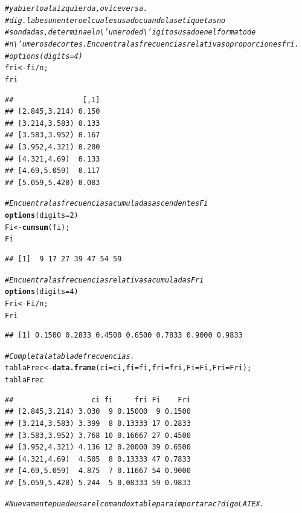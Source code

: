 \documentclass[12pt,letterpaper]{article}\usepackage[]{graphicx}\usepackage[]{color}
\makeatletter
\newcommand{\hlnum}[1]{\textcolor[rgb]{0.686,0.059,0.569}{#1}}%
\newcommand{\hlcom}[1]{\textcolor[rgb]{0.678,0.584,0.686}{\textit{#1}}}%
\newcommand{\hlopt}[1]{\textcolor[rgb]{0,0,0}{#1}}%
\newcommand{\hlstd}[1]{\textcolor[rgb]{0.345,0.345,0.345}{#1}}%
\newcommand{\hlkwb}[1]{\textcolor[rgb]{0.69,0.353,0.396}{#1}}%
\newcommand{\hlkwc}[1]{\textcolor[rgb]{0.333,0.667,0.333}{#1}}%
\newcommand{\hlkwd}[1]{\textcolor[rgb]{0.737,0.353,0.396}{\textbf{#1}}}%
\newenvironment{kframe}{%
 \def\at@end@of@kframe{}%
 \ifinner\ifhmode%
  \def\at@end@of@kframe{\end{minipage}}%
  \begin{minipage}{\columnwidth}%
 \fi\fi%
 \def\FrameCommand##1{\hskip\@totalleftmargin \hskip-\fboxsep
 \colorbox{shadecolor}{##1}\hskip-\fboxsep
     \hskip-\linewidth \hskip-\@totalleftmargin \hskip\columnwidth}%
 \MakeFramed {\advance\hsize-\width
   \@totalleftmargin\z@ \linewidth\hsize
   \@setminipage}}%
 {\par\unskip\endMakeFramed%
 \at@end@of@kframe}
\newenvironment{knitrout}{}{} %
\makeatother
\begin{document}
\begin{knitrout}
\begin{kframe}
\begin{alltt}
\hlcom{# y abierto a la izquierda, o viceversa.}
\hlcom{# dig.lab es un entero el cual es usado cuando las etiquetas no }
\hlcom{# son dadas, determina el n\textbackslash{}'umero de d\textbackslash{}'igitos usado en el formato de }
\hlcom{# n\textbackslash{}'umeros de cortes.Encuentra las frecuencias relativas o proporciones fri.}
\hlcom{# options(digits=4)}
\hlstd{fri} \hlkwb{<-} \hlstd{fi}\hlopt{/}\hlstd{n;}
\hlstd{fri}
\end{alltt}
\begin{verbatim}
##                [,1]
## [2.845,3.214) 0.150
## [3.214,3.583) 0.133
## [3.583,3.952) 0.167
## [3.952,4.321) 0.200
## [4.321,4.69)  0.133
## [4.69,5.059)  0.117
## [5.059,5.428) 0.083
\end{verbatim}
\begin{alltt}
\hlcom{# Encuentra las frecuencias acumuladas ascendentes Fi}
\hlkwd{options}\hlstd{(}\hlkwc{digits}\hlstd{=}\hlnum{2}\hlstd{)}
\hlstd{Fi} \hlkwb{<-} \hlkwd{cumsum}\hlstd{(fi);}
\hlstd{Fi}
\end{alltt}
\begin{verbatim}
## [1]  9 17 27 39 47 54 59
\end{verbatim}
\begin{alltt}
\hlcom{# Encuentra las frecuencias relativas acumuladas Fri}
\hlkwd{options}\hlstd{(}\hlkwc{digits}\hlstd{=}\hlnum{4}\hlstd{)}
\hlstd{Fri} \hlkwb{<-} \hlstd{Fi}\hlopt{/}\hlstd{n;}
\hlstd{Fri}
\end{alltt}
\begin{verbatim}
## [1] 0.1500 0.2833 0.4500 0.6500 0.7833 0.9000 0.9833
\end{verbatim}
\begin{alltt}
\hlcom{# Completa la tabla de frecuencias.}
\hlstd{tablaFrec} \hlkwb{<-} \hlkwd{data.frame}\hlstd{(}\hlkwc{ci}\hlstd{=ci,} \hlkwc{fi}\hlstd{=fi,} \hlkwc{fri}\hlstd{=fri,} \hlkwc{Fi}\hlstd{=Fi,} \hlkwc{Fri}\hlstd{=Fri);}
\hlstd{tablaFrec}
\end{alltt}
\begin{verbatim}
##                  ci fi     fri Fi    Fri
## [2.845,3.214) 3.030  9 0.15000  9 0.1500
## [3.214,3.583) 3.399  8 0.13333 17 0.2833
## [3.583,3.952) 3.768 10 0.16667 27 0.4500
## [3.952,4.321) 4.136 12 0.20000 39 0.6500
## [4.321,4.69)  4.505  8 0.13333 47 0.7833
## [4.69,5.059)  4.875  7 0.11667 54 0.9000
## [5.059,5.428) 5.244  5 0.08333 59 0.9833
\end{verbatim}
\begin{alltt}
\hlcom{# Nuevamente puede usar el comando xtable para importar a c?digo LATEX.}
\end{alltt}
\end{kframe}
\end{knitrout}
\end{document}
